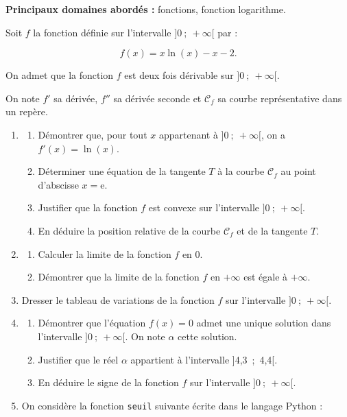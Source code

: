 \textbf{Principaux domaines abordés :} fonctions, fonction logarithme.

\medskip

Soit $f$ la fonction définie sur l'intervalle $]0~;~+\infty[$ par :

\[f(x) = x \ln (x) - x - 2.\]

On admet que la fonction $f$ est deux fois dérivable sur $]0~;~+\infty[$.

On note $f'$ sa dérivée, $f''$ sa dérivée seconde et $\mathcal{C}_f$ sa courbe représentative dans un repère.

\medskip

\begin{enumerate}
\item 
	\begin{enumerate}
		\item Démontrer que, pour tout $x$ appartenant à $]0~;~+\infty[$, on a $f'(x) = \ln (x)$.
		\item Déterminer une équation de la tangente $T$ à la courbe $\mathcal{C}_f$ au point
d'abscisse $x = $e.
		\item Justifier que la fonction $f$ est convexe sur l'intervalle $]0~;~+\infty[$.
		\item En déduire la position relative de la courbe $\mathcal{C}_f$ et de la tangente $T$.
	\end{enumerate}	
\item 
	\begin{enumerate}
		\item Calculer la limite de la fonction $f$ en $0$.
		\item Démontrer que la limite de la fonction $f$ en $+\infty$ est égale à $+\infty$.
	\end{enumerate}
\item Dresser le tableau de variations de la fonction $f$ sur l'intervalle $]0~;~+\infty[$.
\item 
	\begin{enumerate}
		\item Démontrer que l'équation $f(x) = 0$ admet une unique solution dans
l'intervalle $]0~;~+\infty[$. On note $\alpha$ cette solution.
		\item Justifier que le réel $\alpha$ appartient à l'intervalle ]4,3~;~4,4[.
		\item En déduire le signe de la fonction $f$ sur l'intervalle $]0~;~+\infty[$.
	\end{enumerate}	
\item On considère la fonction \texttt{seuil} suivante écrite dans le langage Python :


\end{enumerate}
